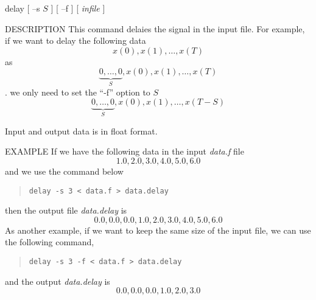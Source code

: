 
\begin{synopsis}
\item [delay] [ --s $S$ ] [ --f ] [ {\em infile} ] 
\end{synopsis}

\begin{qsection}{DESCRIPTION}
 This command delaies the signal in the input file.
 For example, if we want to delay the following data
\[ x(0), x(1), \ldots , x(T) \]
as
\[ \underbrace{0, \ldots , 0}_{S}, x(0), x(1), \ldots , x(T) \].
we only need to set the ``-f'' option to $S$
\[ \underbrace{0, \ldots , 0}_{S}, x(0), x(1), \ldots , x(T-S) \]
\par
Input and output data is in float format.
\end{qsection}

\begin{options}
\end{options}

\begin{qsection}{EXAMPLE}
If we have the following data in the input {\em data.f} file
\begin{displaymath}
 1.0, 2.0, 3.0, 4.0, 5.0, 6.0
\end{displaymath}
and we use the command below
\begin{quote}
 \verb!delay -s 3 < data.f > data.delay!
\end{quote}
then the output file {\em data.delay} is 
\begin{displaymath}
 0.0, 0.0, 0.0, 1.0, 2.0, 3.0, 4.0, 5.0, 6.0
\end{displaymath}
As another example, if we want to keep the same size of the input file,
we can use the following command,
\begin{quote}
\verb!delay -s 3 -f < data.f > data.delay!
\end{quote}
and the output {\em data.delay} is
\begin{displaymath}
 0.0, 0.0, 0.0, 1.0, 2.0, 3.0
\end{displaymath}
\end{qsection}

